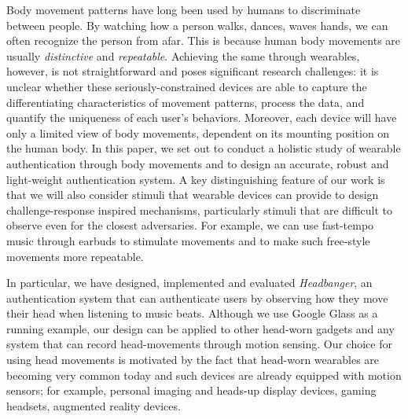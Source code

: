 \vspace{1mm} Body movement
patterns have long been used by humans to discriminate between people. By
watching how a person walks, dances, waves hands, we can often recognize
the person from afar. This is because human body movements are usually
\emph{distinctive} and \emph{repeatable}. Achieving the same through
wearables, however, is not straightforward and poses significant research
challenges: it is unclear whether these seriously-constrained devices are able
to capture the differentiating characteristics of movement patterns, process the data, and quantify the
uniqueness of each user's behaviors. Moreover, each device will have only a
limited view of body movements, dependent on its mounting position on the
human body. In this paper, we set out to conduct a holistic study of wearable
authentication through body movements and to design an accurate, robust and
light-weight authentication system. A key distinguishing feature of our work
is that we will also consider stimuli that wearable devices can provide to
design challenge-response inspired mechanisms, particularly stimuli that are
difficult to observe even for the closest adversaries. For example, we can use
fast-tempo music through earbuds to stimulate movements and to make such
free-style movements more repeatable.

In particular, we have designed, implemented and evaluated {\em Headbanger},
an authentication system that can authenticate users by observing how they move their head when listening to music beats. Although we
use Google Glass as a running example, our design can
be applied to other head-worn gadgets and any system that can record
head-movements through motion sensing. Our choice for using head movements is
motivated by the fact that head-worn wearables are becoming very common today
and such devices are already equipped with motion sensors; for example,
personal imaging and heads-up display devices, gaming headsets, augmented reality devices.


